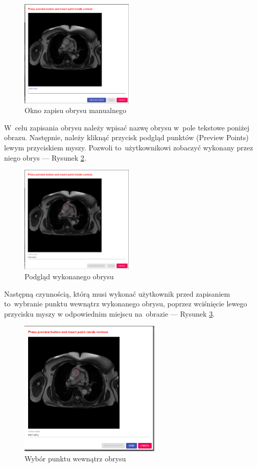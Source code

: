 \documentclass[a4paper,11pt,twoside,openright]{report}
\theoremstyle{definition}
\begin{document}
\begin{figure}[h!]
	\center
	\includegraphics[width=0.48\textwidth]{6}
	\caption{Okno zapisu obrysu manualnego}
    	\label{fig:6}
\end{figure}

W~celu zapisania obrysu należy wpisać nazwę obrysu w~pole tekstowe poniżej obrazu.
Następnie, należy kliknąć przycisk podgląd punktów (Preview Points)
lewym przyciskiem myszy. Pozwoli to~użytkownikowi zobaczyć wykonany przez niego
obrys --- Rysunek \ref{fig:7}.

\begin{figure}[h!]
	\center
	\includegraphics[width=0.48\textwidth]{7}
	\caption{Podgląd wykonanego obrysu}
    	\label{fig:7}
\end{figure}

Następną czynnością, którą musi wykonać użytkownik przed zapisaniem to~wybranie
punktu wewnątrz wykonanego obrysu, poprzez wciśnięcie lewego przycisku myszy w
odpowiednim miejscu na~obrazie --- Rysunek \ref{fig:8}.

\pagebreak

\begin{figure}[h!]
	\center
	\includegraphics[width=0.6\textwidth]{8}
	\caption{Wybór punktu wewnątrz obrysu}
    	\label{fig:8}
\end{figure}
\end{document}
